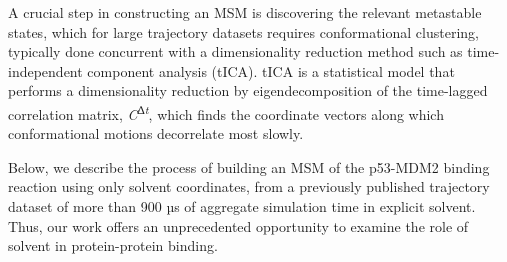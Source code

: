 A crucial step in constructing an MSM is discovering the relevant
metastable states, which for large trajectory datasets requires
conformational clustering, typically done concurrent with a dimensionality
reduction method such as time-independent component analysis (tICA).
tICA is a statistical model that performs a dimensionality reduction by
eigendecomposition of the time-lagged correlation matrix,
\emph{C}\textsuperscript{∆\emph{t}}, which finds the coordinate vectors
along which conformational motions decorrelate most slowly. \cite{bowman2013introduction}

Below, we describe the process of building an MSM of the p53-MDM2
binding reaction using only solvent coordinates, from a previously
published trajectory dataset \cite{zhou2017bridging} of more than 900 µs of aggregate
simulation time in explicit solvent. Thus, our work offers an
unprecedented opportunity to examine the role of solvent in
protein-protein binding.

